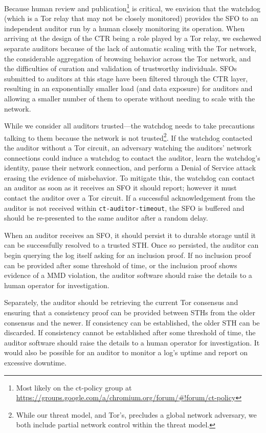 Because human review and publication\footnote{Most likely on the ct-policy group
at \url{https://groups.google.com/a/chromium.org/forum/\#!forum/ct-policy}} is
critical, we envision that the watchdog (which is a Tor relay that may not be
closely monitored) provides the SFO to an independent auditor run by a human
closely monitoring its operation. When arriving at the design of the CTR being a
role played by a Tor relay, we eschewed separate auditors because of the lack of
automatic scaling with the Tor network, the considerable aggregation of browsing
behavior across the Tor network, and the difficulties of curation and validation
of trustworthy individuals. SFOs submitted to auditors at this stage have been
filtered through the CTR layer, resulting in an exponentially smaller load (and
data exposure) for auditors and allowing a smaller number of them to operate
without needing to scale with the network.

While we consider all auditors trusted---the watchdog needs to take precautions
talking to them because the network is not trusted\footnote{While our threat
model, and Tor's, precludes a global network adversary, we both include partial
network control within the threat model.}. If the watchdog contacted the auditor
without a Tor circuit, an adversary watching the auditors' network connections
could induce a watchdog to contact the auditor, learn the watchdog's identity,
pause their network connection, and perform a Denial of Service attack erasing
the evidence of misbehavior. To mitigate this, the watchdog can contact an
auditor as soon as it receives an SFO it should report; however it must contact
the auditor over a Tor circuit. If a successful acknowledgement from the auditor
is not received within \texttt{ct-auditor-timeout}, the SFO is buffered and
should be re-presented to the same auditor after a random delay.

When an auditor receives an SFO, it should persist it to durable storage until
it can be successfully resolved to a trusted STH\@. Once so persisted, the
auditor can begin querying the log itself asking for an inclusion proof. If no
inclusion proof can be provided after some threshold of time, or the inclusion
proof shows evidence of a MMD violation, the auditor software should raise the
details to a human operator for investigation.

Separately, the auditor should be retrieving the current Tor consensus and
ensuring that a consistency proof can be provided between STHs from the older
consensus and the newer. If consistency can be established, the older STH can be
discarded. If consistency cannot be established after some threshold of time,
the auditor software should raise the details to a human operator for
investigation. It would also be possible for an auditor to monitor a log's
uptime and report on excessive downtime.

